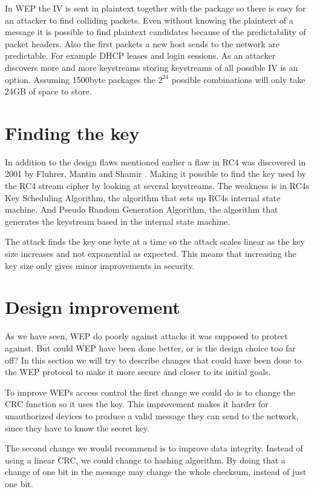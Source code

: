 \documentclass[twocolumn,11pt]{IEEEtran}
\begin{document}
In WEP the IV is sent in plaintext together with the package so there is easy for an attacker to find colliding packets. Even without knowing the plaintext of a message it is possible to find plaintext candidates because of the predictability of packet headers. Also the first packets a new host sends to the network are predictable. For example DHCP leases and login sessions. As an attacker discovers more and more keystreams storing keystreams of all possible IV is an option. Assuming 1500byte packages the $2^24$ possible combinations will only take 24GB of space to store.

\section {Finding the key}
\label{sec:find_key}
In addition to the design flaws mentioned earlier a flaw in RC4 was discovered in 2001 by Fluhrer, Mantin and Shamir \cite{Fluhrer:New}. Making it possible to find the key used by the RC4 stream cipher by looking at several keystreams. The weakness is in RC4s Key Scheduling Algorithm, the algorithm that sets up RC4s internal state machine. And Pseudo Random Generation Algorithm, the algorithm that generates the keystream based in the internal state machine. 

The attack finds the key one byte at a time so the attack scales linear as the key size increases and not exponential as expected. This means that increasing the key size only gives minor improvements in security.


\section{Design improvement}
\label{sec:improvement}

As we have seen, WEP do poorly against attacks it was supposed to protect against. But could WEP have been done better, or is the design choice too far off? In this section we will try to describe changes that could have been done to the WEP protocol to make it more secure and closer to its initial goals.

To improve WEPs access control the first change we could do is to change the CRC function so it uses the key. This improvement makes it harder for unauthorized devices to produce a valid message they can send to the network, since they have to know the secret key. 

The second change we would recommend is to improve data integrity. Instead of using a linear CRC, we could change to hashing algorithm. By doing that a change of one bit in the message may change the whole checksum, instead of just one bit. 
\end{document}
